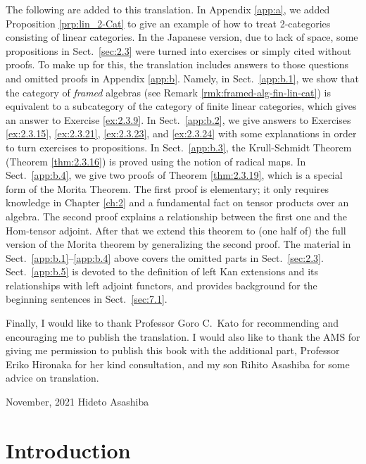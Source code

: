 \documentclass{surv-l}
\numberwithin{equation}{chapter}
\numberwithin{figure}{chapter}
\theoremstyle{plain}
\theoremstyle{definition}
\theoremstyle{remark}
\begin{document}
The following are added to this translation.
In Appendix \ref{app:a}, we added Proposition \ref{prp:lin_2-Cat} to give an example of how to treat
2-categories consisting of linear categories.
In the Japanese version, due to lack of space, some propositions in Sect.\ \ref{sec:2.3}
were turned into exercises or simply cited without proofs.
To make up for this, the translation includes answers to those questions and omitted proofs in Appendix \ref{app:b}.
Namely, in Sect.\ \ref{app:b.1}, we show that the category of {\em framed} algebras
(see Remark \ref{rmk:framed-alg-fin-lin-cat})
is equivalent to a subcategory of the category of finite linear categories,
which gives an answer to Exercise \ref{ex:2.3.9}.
In Sect.\ \ref{app:b.2}, we give answers to Exercises \ref{ex:2.3.15}, \ref{ex:2.3.21}, \ref{ex:2.3.23}, and \ref{ex:2.3.24}
with some explanations in order to turn exercises to propositions.
In Sect.\ \ref{app:b.3}, the Krull-Schmidt Theorem (Theorem \ref{thm:2.3.16}) is proved using the notion of radical maps.
In Sect.\ \ref{app:b.4}, we give two proofs of Theorem \ref{thm:2.3.19}, which is a special form of the Morita Theorem.
The first proof is elementary; it only requires knowledge in Chapter \ref{ch:2} and
a fundamental fact on tensor products over an algebra.
The second proof explains a relationship between the first one and the Hom-tensor adjoint.
After that we extend this theorem to (one half of) the full version of the Morita theorem
by generalizing the second proof.
The material in Sect.\ \ref{app:b.1}--\ref{app:b.4} above covers the omitted parts in Sect.\ \ref{sec:2.3}.
Sect.\ \ref{app:b.5} is devoted to the definition of left Kan extensions and its relationships with left adjoint functors, and provides background for the beginning sentences in Sect.\ \ref{sec:7.1}.

\pagebreak

Finally, I would like to thank Professor Goro C.\ Kato for recommending and encouraging me
to publish the translation.
I would also like to thank the AMS for giving me permission to publish this book
with the additional part, Professor Eriko Hironaka for her kind
consultation, and my son Rihito Asashiba for some advice on translation.
\medskip

November, 2021
\hfill Hideto Asashiba


\setcounter{footnote}{0}
\chapter*{Introduction}
\end{document}
